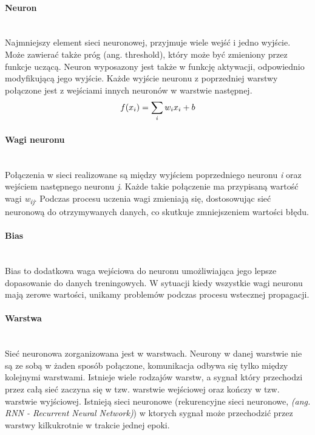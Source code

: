 \paragraph{Neuron} \mbox{}\\
Najmniejszy element sieci neuronowej, przyjmuje wiele wejść i jedno wyjście. Może
zawierać także próg (ang. threshold), który może być zmieniony przez funkcje uczącą.
Neuron wyposazony jest także w funkcję aktywacji, odpowiednio modyfikującą jego wyjście.
Każde wyjście neuronu z poprzedniej warstwy połączone jest z wejściami innych neuronów
w warstwie następnej.
\begin{equation}
f(x_{i}) = \sum_{i}w_{i}x_{i} + b \\
\end{equation}

\paragraph{Wagi neuronu} \mbox{}\\
Połączenia w sieci realizowane są między wyjściem poprzedniego neuronu \textit{i}
oraz wejściem następnego neuronu \textit{j}. Każde takie połączenie ma przypisaną
wartość wagi \textit{w\textsubscript{ij}}. Podczas procesu uczenia wagi zmieniają
się, dostosowując sieć neuronową do otrzymywanych danych, co skutkuje
zmniejszeniem wartości błędu.

\paragraph{Bias} \mbox{}\\
Bias to dodatkowa waga wejściowa do neuronu umożliwiająca jego lepsze dopasowanie
do danych treningowych. W sytuacji kiedy wszystkie wagi neuronu mają zerowe
wartości, unikamy problemów podczas procesu wstecznej propagacji.

\paragraph{Warstwa} \mbox{}\\
Sieć neuronowa zorganizowana jest w warstwach. Neurony w danej warstwie nie są
ze sobą w żaden sposób połączone, komunikacja odbywa się tylko między kolejnymi
warstwami. Istnieje wiele rodzajów warstw, a sygnał który przechodzi przez całą
sieć zaczyna się w tzw. warstwie wejściowej oraz kończy w tzw. warstwie wyjściowej.
Istnieją sieci neuronowe (rekurencyjne sieci neuronowe, \textit{(ang. RNN - Recurrent Neural Network)})
w ktorych sygnał może przechodzić przez warstwy kilkukrotnie w trakcie jednej epoki.


